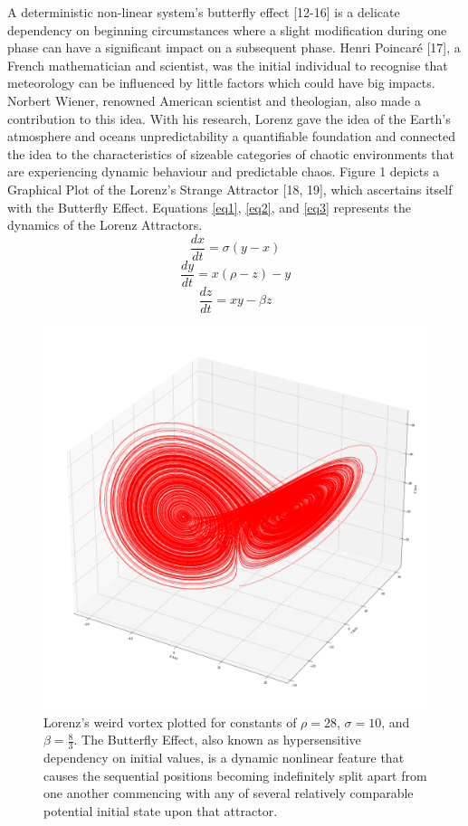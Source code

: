\documentclass[conference]{IEEEtran}
\begin{document}
A deterministic non-linear system's butterfly effect [12-16] is a delicate dependency on beginning circumstances where a slight modification during one phase can have a significant impact on a subsequent phase. Henri Poincaré [17], a French mathematician and scientist, was the initial individual to recognise that meteorology can be influenced by little factors which could have big impacts. Norbert Wiener, renowned American scientist and theologian, also made a contribution to this idea. With his research, Lorenz gave the idea of the Earth's atmosphere and oceans unpredictability a quantifiable foundation and connected the idea to the characteristics of sizeable categories of chaotic environments that are experiencing dynamic behaviour and predictable chaos. Figure 1 depicts a Graphical Plot of the Lorenz's Strange Attractor [18, 19], which ascertains itself with the Butterfly Effect. Equations \ref{eq1}, \ref{eq2}, and \ref{eq3} represents the dynamics of the Lorenz Attractors. 
\begin{equation}\label{eq1}
\frac{dx}{dt}=\sigma\left(y-x\right)
\end{equation}
\begin{equation}\label{eq2}
\frac{dy}{dt}=x\left(\rho-z\right)-y
\end{equation}
\begin{equation}\label{eq3}
\frac{dz}{dt}=xy-\beta z
\end{equation}
\begin{figure}
\centerline{\includegraphics[width = \linewidth]{1.png}}
\caption{Lorenz's weird vortex plotted for constants of $\rho=28$, $\sigma=10$, and $\beta=\frac{8}{3}$. The Butterfly Effect, also known as hypersensitive dependency on initial values, is a dynamic nonlinear feature that causes the sequential positions becoming indefinitely split apart from one another commencing with any of several relatively comparable potential initial state upon that attractor.}
\end{figure}
\end{document}
